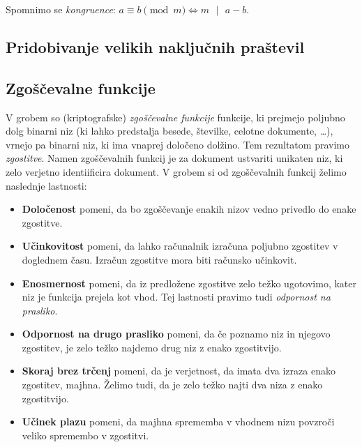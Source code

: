 \documentclass[isrm2, tisk]{fmfdelo}
\begin{document}
\begin{opomba}
    Spomnimo se \textit{kongruence}: $a \equiv b \pmod m \iff m \text{ }|\text{ } a - b$.
\end{opomba}

\subsection{Pridobivanje velikih naključnih praštevil}

\subsection{Zgoščevalne funkcije}
V grobem so (kriptografske) \textit{zgoščevalne funkcije} funkcije, ki prejmejo poljubno dolg binarni 
niz (ki lahko predstalja besede, številke, celotne dokumente, \dots), vrnejo pa binarni niz, ki ima 
vnaprej določeno dolžino. Tem rezultatom pravimo \textit{zgostitve}. Namen zgoščevalnih funkcij je 
za dokument ustvariti unikaten niz, ki zelo verjetno identiificira dokument. V grobem si od zgoščevalnih 
funkcij želimo naslednje lastnosti:
\begin{itemize}
    \item \textbf{Določenost} pomeni, da bo zgoščevanje enakih nizov vedno privedlo do enake 
        zgostitve. 
    \item \textbf{Učinkovitost} pomeni, da lahko računalnik izračuna poljubno zgostitev v doglednem 
        času. Izračun zgostitve mora biti računsko učinkovit.
    \item \textbf{Enosmernost} pomeni, da iz predložene zgostitve zelo težko ugotovimo, kater niz 
        je funkcija prejela kot vhod. Tej lastnosti pravimo tudi \textit{odpornost na prasliko}.
    \item \textbf{Odpornost na drugo prasliko} pomeni, da če poznamo niz in njegovo zgostitev, 
        je zelo težko najdemo drug niz z enako zgostitvijo.
    \item \textbf{Skoraj brez trčenj} pomeni, da je verjetnost, da imata dva izraza enako zgostitev,
        majhna. Želimo tudi, da je zelo težko najti dva niza z enako zgostitvijo.
    \item \textbf{Učinek plazu} pomeni, da majhna sprememba v vhodnem nizu povzroči veliko spremembo 
        v zgostitvi.
\end{itemize}
\end{document}
